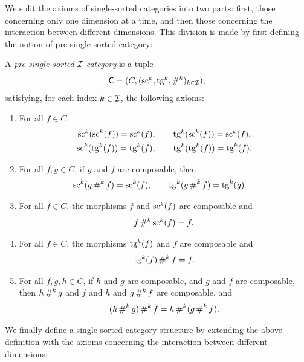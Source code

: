 We split the axioms of single-sorted categories into two parts: first, those concerning only one
dimension at a time, and then those concerning the interaction between different dimensions. This
division is made by first defining the notion of pre-single-sorted category:

\begin{definition}
  \label{def:PreSingleSortedCategory}
  \leanok
  A \emph{pre-single-sorted $\mathcal{I}$-category} is a tuple
  \[
    \mathsf{C} = (C, (\operatorname{sc}^k, \operatorname{tg}^k, \operatorname{\#}^k)_{k \in \mathcal{I}}),
  \]
  satisfying, for each index $k \in \mathcal{I}$, the following axioms:

  \begin{enumerate}
    \item \label{ax:ss_glob} For all $f \in C$,
      \begin{align*}
        \operatorname{sc}^k (\operatorname{sc}^k (f)) = \operatorname{sc}^k (f), \qquad & \operatorname{tg}^k (\operatorname{sc}^k (f)) = \operatorname{sc}^k (f), \\
        \operatorname{sc}^k (\operatorname{tg}^k (f)) = \operatorname{tg}^k (f), \qquad & \operatorname{tg}^k (\operatorname{tg}^k (f)) = \operatorname{tg}^k (f).
      \end{align*}
    \item \label{ax:ss_sc_tg_comp} For all $f, g \in C$, if $g$ and $f$ are composable, then
      \begin{align*}
        \operatorname{sc}^k (g \operatorname{\#}^k f) = \operatorname{sc}^k (f), \qquad & \operatorname{tg}^k (g \operatorname{\#}^k f) = \operatorname{tg}^k (g).
      \end{align*}
    \item \label{ax:ss_right_id} For all $f \in C$, the morphisms $f$ and $\operatorname{sc}^k (f)$ are composable
      and
      \[
        f \operatorname{\#}^k \operatorname{sc}^k (f) = f.
      \]
    \item \label{ax:ss_left_id} For all $f \in C$, the morphisms $\operatorname{tg}^k (f)$ and $f$ are composable
      and
      \[
        \operatorname{tg}^k (f) \operatorname{\#}^k f = f.
      \]
    \item \label{ax:ss_assoc} For all $f, g, h \in C$, if $h$ and $g$ are composable, and $g$ and
      $f$ are composable, then $h \operatorname{\#}^k g$ and $f$ and $h$ and $g \operatorname{\#}^k f$ are composable, and
      \[
        (h \operatorname{\#}^k g) \operatorname{\#}^k f = h \operatorname{\#}^k (g \operatorname{\#}^k f).
      \]
  \end{enumerate}
\end{definition}

We finally define a single-sorted category structure by extending the above definition with the
axioms concerning the interaction between different dimensions:

